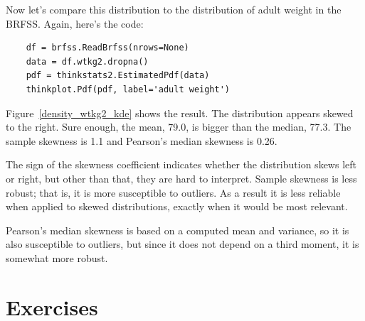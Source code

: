 \documentclass[12pt]{book}
\begin{document}
Now let's compare this distribution to the distribution of adult
weight in the BRFSS.  Again, here's the code:

\begin{verbatim}
    df = brfss.ReadBrfss(nrows=None)
    data = df.wtkg2.dropna()
    pdf = thinkstats2.EstimatedPdf(data)
    thinkplot.Pdf(pdf, label='adult weight')
\end{verbatim}

Figure~\ref{density_wtkg2_kde} shows the result.  The distribution
appears skewed to the right.  Sure enough, the mean, 79.0, is bigger
than the median, 77.3.  The sample skewness is 1.1 and Pearson's
median skewness is 0.26.

The sign of the skewness coefficient indicates whether the distribution
skews left or right, but other than that, they are hard to interpret.
Sample skewness is less robust; that is, it is more
susceptible to outliers.  As a result it is less reliable
when applied to skewed distributions, exactly when it would be most
relevant.

Pearson's median skewness is based on a computed mean and variance,
so it is also susceptible to outliers, but since it does not depend
on a third moment, it is somewhat more robust.


\section{Exercises}
\end{document}
